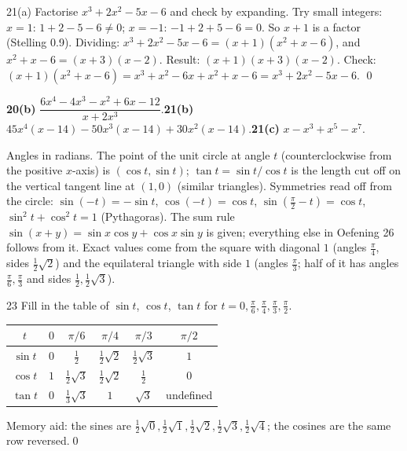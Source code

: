 \begin{bookex}{21(a)}
Factorise $x^3+2x^2-5x-6$ and check by expanding.
\solution
Try small integers: $x=1$: $1+2-5-6\ne0$; $x=-1$: $-1+2+5-6=0$. So $x+1$ is a factor (Stelling 0.9). Dividing: $x^3+2x^2-5x-6=(x+1)(x^2+x-6)$, and $x^2+x-6=(x+3)(x-2)$. Result: $(x+1)(x+3)(x-2)$. Check: $(x+1)(x^2+x-6)=x^3+x^2-6x+x^2+x-6=x^3+2x^2-5x-6$. \checkmark\qed
\end{bookex}

\begin{trybox}[{20(b), 21(b), 21(c)}]
\textbf{20(b)} $\dfrac{6x^4-4x^3-x^2+6x-12}{x+2x^3}$.\quad \textbf{21(b)} $45x^4(x-14)-50x^3(x-14)+30x^2(x-14)$.\quad \textbf{21(c)} $x-x^3+x^5-x^7$.
\end{trybox}


\begin{key}
Angles in radians. The point of the unit circle at angle $t$ (counterclockwise from the positive $x$-axis) is $(\cos t,\sin t)$; $\tan t=\sin t/\cos t$ is the length cut off on the vertical tangent line at $(1,0)$ (similar triangles). Symmetries read off from the circle: $\sin(-t)=-\sin t$, $\cos(-t)=\cos t$, $\sin(\frac\pi2-t)=\cos t$, $\sin^2t+\cos^2t=1$ (Pythagoras). The sum rule $\sin(x+y)=\sin x\cos y+\cos x\sin y$ is given; everything else in Oefening 26 follows from it. Exact values come from the square with diagonal $1$ (angles $\frac\pi4$, sides $\frac12\sqrt2$) and the equilateral triangle with side $1$ (angles $\frac\pi3$; half of it has angles $\frac\pi6,\frac\pi3$ and sides $\frac12,\frac12\sqrt3$).
\end{key}

\begin{bookex}{23}
Fill in the table of $\sin t$, $\cos t$, $\tan t$ for $t=0,\frac\pi6,\frac\pi4,\frac\pi3,\frac\pi2$.
\solution
\begin{center}\renewcommand{\arraystretch}{1.3}
\begin{tabular}{c|ccccc}
$t$ & $0$ & $\pi/6$ & $\pi/4$ & $\pi/3$ & $\pi/2$\\\hline
$\sin t$ & $0$ & $\frac12$ & $\frac12\sqrt2$ & $\frac12\sqrt3$ & $1$\\
$\cos t$ & $1$ & $\frac12\sqrt3$ & $\frac12\sqrt2$ & $\frac12$ & $0$\\
$\tan t$ & $0$ & $\frac13\sqrt3$ & $1$ & $\sqrt3$ & undefined
\end{tabular}
\end{center}
Memory aid: the sines are $\frac12\sqrt0,\frac12\sqrt1,\frac12\sqrt2,\frac12\sqrt3,\frac12\sqrt4$; the cosines are the same row reversed.\qed
\end{bookex}


